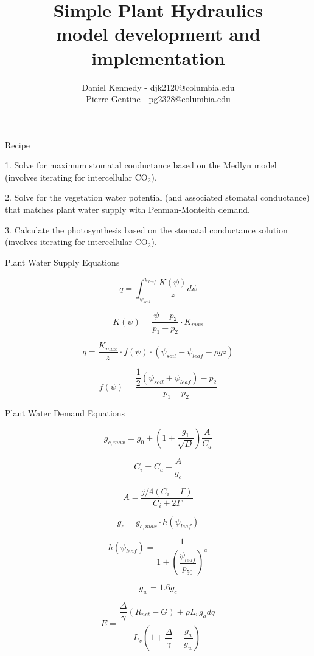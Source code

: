 \documentclass[11pt]{article}
\title{Simple Plant Hydraulics \large \\ model development and implementation}
\author{Daniel Kennedy - djk2120@columbia.edu \\ Pierre Gentine - pg2328@columbia.edu}
\begin{document}
\maketitle

Recipe

1. Solve for maximum stomatal conductance based on the Medlyn model (involves iterating for intercellular CO$_2$).

2. Solve for the vegetation water potential (and associated stomatal conductance) that matches plant water supply with Penman-Monteith demand.

3. Calculate the photosynthesis based on the stomatal conductance solution (involves iterating for intercellular CO$_2$).





Plant Water Supply Equations

\begin{equation}
q = \int_{\psi_{soil}}^{\psi_{leaf}}{\dfrac{K\left(\psi\right)}{z}d\psi}
\end{equation}

\begin{equation}
K(\psi) = \dfrac{\psi - p_2}{p_1 - p_2} \cdot K_{max}
\end{equation}

\begin{equation}
q = \dfrac{K_{max}}{z}\cdot f\left(\psi\right) \cdot \left(\psi_{soil}-\psi_{leaf}-\rho g z\right)
\end{equation}

\begin{equation}
f\left(\psi\right) = \dfrac{\dfrac{1}{2} \left(\psi_{soil}+\psi_{leaf}\right) - p_2}{p_1 - p_2}
\end{equation}

Plant Water Demand Equations

\begin{equation}
g_{c,max} = g_0 + \left(1+\dfrac{g_1}{\sqrt{D}}\right)\dfrac{A}{C_a}
\end{equation}

\begin{equation}
C_i = C_a - \dfrac{A}{g_c}
\end{equation}

\begin{equation}
A = \dfrac{j/4\left(C_i-\Gamma\right)}{C_i+2\Gamma}
\end{equation}

\begin{equation}
g_c = g_{c,max}\cdot h\left(\psi_{leaf}\right)
\end{equation}

\begin{equation}
h\left(\psi_{leaf}\right) = 
\dfrac{1}{
1+\left(\dfrac{\psi_{leaf}}{p_{50}}\right)^a
}
\end{equation}


\begin{equation}
g_w = 1.6g_c
\end{equation}

\begin{equation}
E = \dfrac{\dfrac{\Delta}{\gamma}\left(R_{net}-G\right)+\rho L_v g_a dq}
{L_v\left(1+\dfrac{\Delta}{\gamma}+\dfrac{g_a}{g_w}\right)}
\end{equation}
\end{document}
